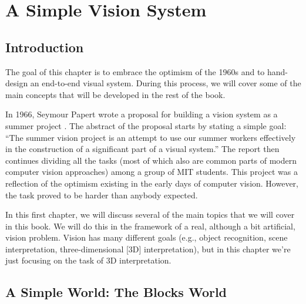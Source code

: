 %	
%	
%	 
%




\chapter{A Simple Vision System}
\label{chapter:simplesystem}

\section{Introduction}

The goal of this chapter is to embrace the optimism of the 1960s and to hand-design an end-to-end visual system. During this process, we will cover some of the main concepts that will be developed in the rest of the book. 


In 1966, Seymour Papert wrote a proposal for building a vision system as a summer project \cite{Papert66}. The abstract of the proposal starts by stating a simple goal: ``The summer vision project is an attempt to use our summer workers effectively in the construction of a significant part of a visual system.'' The report then continues dividing all the tasks (most of which also are common parts of modern computer vision approaches) among a group of MIT students. This project was a reflection of the optimism existing in the early days of computer vision. However, the task proved to be harder than anybody expected.  

In this first chapter, we will discuss several of the main topics that we will cover in this book. We will do this in the framework of a real, although a bit artificial, vision problem. Vision has many different goals (e.g., object recognition, scene interpretation, three-dimensional [3D] interpretation), but in this chapter we're just focusing on the task of 3D interpretation.

\section{A Simple World: The Blocks World}


